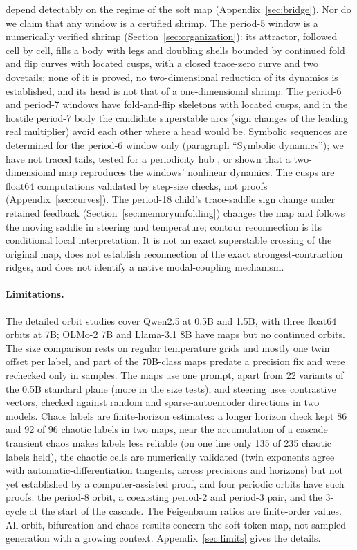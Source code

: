 \documentclass[11pt,letterpaper]{article}
\begin{document}
depend detectably on the regime of the soft map (Appendix~\ref{sec:bridge}). Nor do we claim that any window is a certified shrimp. The period-5 window is a numerically verified shrimp
(Section~\ref{sec:organization}): its attractor, followed cell by cell, fills a body with legs and doubling shells bounded
by continued fold and flip curves with located cusps, with a closed trace-zero curve and two dovetails; none of it is
proved, no two-dimensional reduction of its dynamics is established, and its head is not that of a one-dimensional
shrimp. The period-6 and period-7 windows have fold-and-flip skeletons with
located cusps, and in the hostile period-7 body the candidate superstable arcs (sign changes of the leading real
multiplier) avoid each other where a head would be. Symbolic
sequences are determined for the period-6 window only (paragraph ``Symbolic dynamics''); we have not traced tails,
tested for a periodicity hub \cite{vitolo2011hubs,jones2012rossler}, or shown that a two-dimensional map reproduces the
windows' nonlinear dynamics. The cusps are float64
computations validated by step-size checks, not proofs (Appendix~\ref{sec:curves}). The period-18 child's
trace-saddle sign change under retained feedback (Section~\ref{sec:memoryunfolding}) changes the map and follows
the moving saddle in steering and temperature; contour reconnection is its conditional local interpretation. It is not an exact superstable crossing of the original map, does not establish
reconnection of the exact strongest-contraction ridges, and does not identify a native modal-coupling mechanism.

\paragraph{Limitations.} The detailed orbit studies cover Qwen2.5 at 0.5B and 1.5B, with three float64 orbits at 7B;
OLMo-2 7B and Llama-3.1 8B have maps but no continued orbits. The size comparison rests on regular temperature grids and mostly one twin
offset per label, and part of the 70B-class maps predate a precision fix and were rechecked only in samples. The maps
use one prompt, apart from 22 variants of the 0.5B standard plane (more in the size tests), and steering uses contrastive vectors, checked against random and
sparse-autoencoder directions in two models. Chaos labels are finite-horizon estimates: a longer horizon check kept 86
and 92 of 96 chaotic labels in two maps, near the accumulation of a cascade transient chaos makes labels less reliable (on one line only 135 of 235 chaotic labels held), the chaotic cells are numerically validated (twin exponents agree with automatic-differentiation tangents, across precisions and horizons) but not yet established by a computer-assisted proof, and four periodic orbits have such proofs: the period-8 orbit, a coexisting period-2 and period-3 pair, and the
3-cycle at the start of the cascade. The Feigenbaum ratios are
finite-order values. All orbit, bifurcation and chaos results concern the soft-token map, not sampled generation with
a growing context. Appendix~\ref{sec:limits} gives the details.
\end{document}
